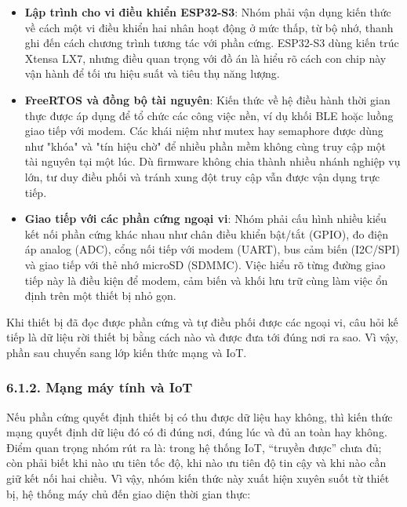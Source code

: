 \documentclass[a4paper]{extarticle}
\providecommand{\tightlist}{%
  \setlength{\itemsep}{0pt}\setlength{\parskip}{0pt}}
\begin{document}
\begin{itemize}
\tightlist
\item
  \textbf{Lập trình cho vi điều khiển ESP32-S3}: Nhóm phải vận dụng kiến
  thức về cách một vi điều khiển hai nhân hoạt động ở mức thấp, từ bộ
  nhớ, thanh ghi đến cách chương trình tương tác với phần cứng. ESP32-S3
  dùng kiến trúc Xtensa LX7, nhưng điều quan trọng với đồ án là hiểu rõ
  cách con chip này vận hành để tối ưu hiệu suất và tiêu thụ năng lượng.
\item
  \textbf{FreeRTOS và đồng bộ tài nguyên}: Kiến thức về hệ điều hành
  thời gian thực được áp dụng để tổ chức các công việc nền, ví dụ khối
  BLE hoặc luồng giao tiếp với modem. Các khái niệm như mutex hay
  semaphore được dùng như "khóa" và "tín hiệu chờ" để nhiều phần mềm
  không cùng truy cập một tài nguyên tại một lúc. Dù firmware không chia
  thành nhiều nhánh nghiệp vụ lớn, tư duy điều phối và tránh xung đột
  truy cập vẫn được vận dụng trực tiếp.
\item
  \textbf{Giao tiếp với các phần cứng ngoại vi}: Nhóm phải cấu hình nhiều
  kiểu kết nối phần cứng khác nhau như chân điều khiển bật/tắt (GPIO),
  đo điện áp analog (ADC), cổng nối tiếp với modem (UART), bus cảm biến
  (I2C/SPI) và giao tiếp với thẻ nhớ microSD (SDMMC). Việc hiểu rõ từng
  đường giao tiếp này là điều kiện để modem, cảm biến và khối lưu trữ
  cùng làm việc ổn định trên một thiết bị nhỏ gọn.
\end{itemize}

Khi thiết bị đã đọc được phần cứng và tự điều phối được các ngoại vi,
câu hỏi kế tiếp là dữ liệu rời thiết bị bằng cách nào và được đưa tới
đúng nơi ra sao. Vì vậy, phần sau chuyển sang lớp kiến thức mạng và
IoT.

\subsubsection{6.1.2. Mạng máy tính và
IoT}\label{612-mux1ea1ng-muxe1y-tuxednh-vuxe0-iot}

Nếu phần cứng quyết định thiết bị có thu được dữ liệu hay không, thì
kiến thức mạng quyết định dữ liệu đó có đi đúng nơi, đúng lúc và đủ an
toàn hay không. Điểm quan trọng nhóm rút ra là: trong hệ thống IoT,
``truyền được'' chưa đủ; còn phải biết khi nào ưu tiên tốc độ, khi nào
ưu tiên độ tin cậy và khi nào cần giữ kết nối hai chiều. Vì vậy, nhóm
kiến thức này xuất hiện xuyên suốt từ thiết bị, hệ thống máy chủ đến giao diện thời
gian thực:
\end{document}
